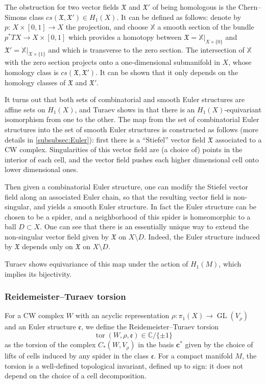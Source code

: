 \documentclass[JEP,XML,SOM,Unicode,NoFloatCountersInSection,published]{cedram}
\theoremstyle{plain}
\theoremstyle{definition}
\theoremstyle{remark}
\newcommand{\C}{\mathbb{C}}
\DeclareMathOperator{\GL}{GL}
\numberwithin{equation}{section}
\DeclareMathOperator{\tor}{tor}
\begin{document}
The obstruction for two vector fields $\mathfrak X$ and $\mathfrak X'$ of being homologous is the Chern--Simons class $cs(\mathfrak X, \mathfrak X') \!\in\!\! H_1(X)$.
It can be defined as follows: denote by \hbox{$p{:}\, X \!\times\! [0,1] \!\to\! X$} the projection, and choose $\mathbb X$ a smooth section of the bundle $p^*TX \to X \times [0,1]$ which provides a homotopy between $\mathfrak X = \mathbb X\vert_{X\times\{0\}}$
and $\mathfrak X' = \mathbb X\vert_{X\times\{1\}}$ and which is transverse to the zero section. The intersection of $\mathbb X$ with the zero section projects onto a one-dimensional submanifold in $X$, whose homology class is $cs(\mathfrak X, \mathfrak X')$. It can be shown that it only depends on the homology classes of $\mathfrak X$ and $\mathfrak X'$.

It turns out that both sets of combinatorial and smooth Euler structures are affine sets on $H_1(X)$, and Turaev shows in \cite[\S 6]{Turaev} that there is an $H_1(X)$-equivariant isomorphism from one to the other.
The map from the set of combinatorial Euler structures into the set of smooth Euler structures is constructed as follows (more details in \cref{subsubsec:Euler}): first there is a ``Stiefel'' vector field $\mathfrak X$ associated to a CW complex.
Singularities of this vector field are (a choice of) points in the interior of each cell, and the vector field pushes each higher dimensional cell onto lower dimensional ones.\par
Then given a combinatorial Euler structure, one can modify the Stiefel vector field along an associated Euler chain, so that the resulting vector field is non-singular, and yields a smooth Euler structure. In fact the Euler structure can be chosen to be a spider, and a neighborhood of this spider is homeomorphic to a ball $D \subset X$. One can see that there is an essentially unique way to extend the non-singular vector field given by $\mathfrak X$ on $X \setminus D$. Indeed, the Euler structure induced by $\mathfrak X$ depends only on $\mathfrak X$ on $X \setminus D$.\par
Turaev shows equivariance of this map under the action of $H_1(M)$, which implies its bijectivity.

\subsubsection{Reidemeister--Turaev torsion}
\label{subsec:RTT}
For a CW complex $W$ with an acyclic representation $\rho\colon \pi_1(X) \to \GL(V_\rho)$ and an Euler structure $\mathfrak e$, we define the Reidemeister--Turaev torsion
\[
\tor(W, \rho, \mathfrak e) \in \C/\{\pm 1\}
\]
as the torsion of the complex $C_*(W, V_\rho)$ in the basis $\boldsymbol{c}^*$ given by the choice of lifts of cells induced by any spider in the class $\mathfrak e$.
For a compact manifold $M$, the torsion is a well-defined topological invariant, defined up to sign: it does not depend on the choice of a cell decomposition.
\end{document}

